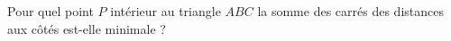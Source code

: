 Pour quel point $P$ intérieur au triangle $ABC$ la somme des carrés des distances aux côtés est-elle minimale ?
